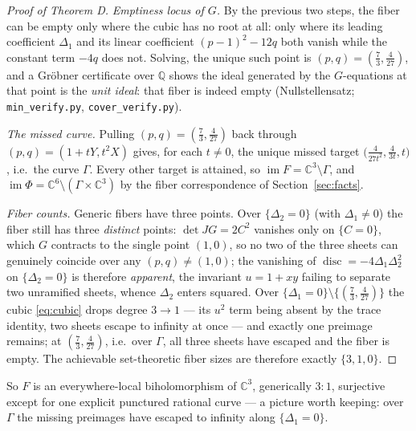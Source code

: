 \documentclass[11pt]{amsart}
\newcommand{\CC}{\mathbb{C}}
\newcommand{\QQ}{\mathbb{Q}}
\newcommand{\im}{\operatorname{im}}
\newcommand{\disc}{\operatorname{disc}}
\theoremstyle{plain}
\theoremstyle{definition}
\theoremstyle{remark}
\begin{document}
\begin{proof}[Proof of Theorem D]
\emph{Emptiness locus of $G$.} By the previous two steps, the fiber can
be empty only where the cubic has no root at all: only where its leading
coefficient $\Delta_{1}$ and its linear coefficient $(p-1)^{2}-12q$ both
vanish while the constant term $-4q$ does not. Solving, the unique such
point is $(p,q)=(\tfrac73,\tfrac{4}{27})$, and a Gr\"obner certificate
over $\QQ$ shows the ideal generated by the $G$-equations at that point
is the \emph{unit ideal}: that fiber is indeed empty (Nullstellensatz;
\texttt{min\_verify.py}, \texttt{cover\_verify.py}).

\emph{The missed curve.} Pulling $(p,q)=(\tfrac73,\tfrac{4}{27})$ back
through $(p,q)=(1+tY,t^{2}X)$ gives, for each $t\neq0$, the unique missed
target $\bigl(\tfrac{4}{27t^{2}},\tfrac{4}{3t},t\bigr)$, i.e.\ the curve
$\Gamma$. Every other target is attained, so
$\im F=\CC^{3}\setminus\Gamma$, and
$\im\Phi=\CC^{6}\setminus(\Gamma\times\CC^{3})$ by the fiber
correspondence of Section~\ref{sec:facts}.

\emph{Fiber counts.} Generic fibers have three points. Over
$\{\Delta_{2}=0\}$ (with $\Delta_{1}\neq0$) the fiber still has three
\emph{distinct} points: $\det JG=2C^{2}$ vanishes only on $\{C=0\}$, which
$G$ contracts to the single point $(1,0)$, so no two of the three sheets
can genuinely coincide over any $(p,q)\neq(1,0)$; the vanishing of
$\disc=-4\Delta_{1}\Delta_{2}^{2}$ on $\{\Delta_{2}=0\}$ is therefore
\emph{apparent}, the invariant $u=1+xy$ failing to separate two unramified
sheets, whence $\Delta_{2}$ enters squared. Over
$\{\Delta_{1}=0\}\setminus\{(\tfrac73,\tfrac{4}{27})\}$ the cubic
\eqref{eq:cubic} drops degree $3\to1$ --- its $u^{2}$ term being absent by
the trace identity, two sheets escape to infinity at once --- and exactly
one preimage remains; at $(\tfrac73,\tfrac{4}{27})$, i.e.\ over $\Gamma$,
all three sheets have escaped and the fiber is empty. The achievable
set-theoretic fiber sizes are therefore exactly $\{3,1,0\}$.
\end{proof}

So $F$ is an everywhere-local biholomorphism of $\CC^{3}$, generically
$3{:}1$, surjective except for one explicit punctured rational curve --- a
picture worth keeping: over $\Gamma$ the missing preimages have escaped
to infinity along $\{\Delta_{1}=0\}$.
\end{document}
